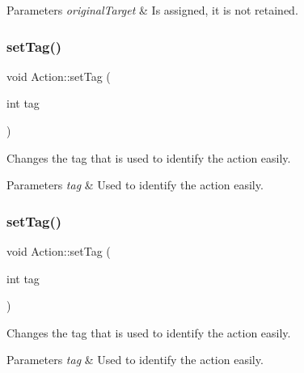 \begin{DoxyParams}{Parameters}
{\em original\+Target} & Is \textquotesingle{}assigned\textquotesingle{}, it is not \textquotesingle{}retained\textquotesingle{}. \\
\hline
\end{DoxyParams}
\mbox{\label{classAction_ac23487f50607b5acef33c1aa7dd9468e}} 
\subsubsection{\texorpdfstring{set\+Tag()}{setTag()}\hspace{0.1cm}{\footnotesize\ttfamily [1/2]}}
{\footnotesize\ttfamily void Action\+::set\+Tag (\begin{DoxyParamCaption}\item[{int}]{tag }\end{DoxyParamCaption})\hspace{0.3cm}{\ttfamily [inline]}}

Changes the tag that is used to identify the action easily.


\begin{DoxyParams}{Parameters}
{\em tag} & Used to identify the action easily. \\
\hline
\end{DoxyParams}
\mbox{\label{classAction_ac23487f50607b5acef33c1aa7dd9468e}} 
\subsubsection{\texorpdfstring{set\+Tag()}{setTag()}\hspace{0.1cm}{\footnotesize\ttfamily [2/2]}}
{\footnotesize\ttfamily void Action\+::set\+Tag (\begin{DoxyParamCaption}\item[{int}]{tag }\end{DoxyParamCaption})\hspace{0.3cm}{\ttfamily [inline]}}

Changes the tag that is used to identify the action easily.


\begin{DoxyParams}{Parameters}
{\em tag} & Used to identify the action easily. \\
\hline
\end{DoxyParams}
\mbox{\label{classAction_abd61e00e97d9604126cf149112b877de}} 
